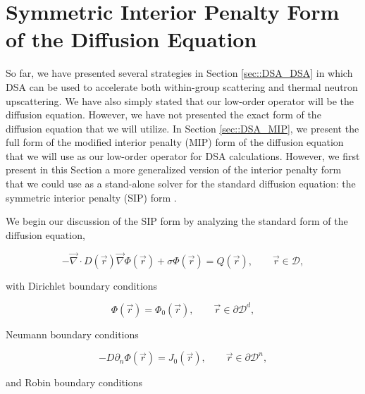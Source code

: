 \section{Symmetric Interior Penalty Form of the Diffusion Equation}
\label{sec::DSA_SIP}

So far, we have presented several strategies in Section \ref{sec::DSA_DSA} in which DSA can be used to accelerate both within-group scattering and thermal neutron upscattering. We have also simply stated that our low-order operator will be the diffusion equation. However, we have not presented the exact form of the diffusion equation that we will utilize. In Section \ref{sec::DSA_MIP}, we present the full form of the modified interior penalty (MIP) form of the diffusion equation that we will use as our low-order operator for DSA calculations. However, we first present in this Section a more generalized version of the interior penalty form that we could use as a stand-alone solver for the standard diffusion equation: the symmetric interior penalty (SIP) form \cite{arnold2002unified,ragusa2015discontinuous,ref::SIP_3D}.

We begin our discussion of the SIP form by analyzing the standard form of the diffusion equation,

\begin{equation}
\label{eq::DSA_standard_diff_eq}
- \vec{\nabla}  \cdot D (\vec{r})  \vec{\nabla} \Phi (\vec{r}) + \sigma \Phi (\vec{r}) = Q (\vec{r}) , \qquad \vec{r} \in \mathcal{D} ,
\end{equation}

\noindent with Dirichlet boundary conditions

\begin{equation}
\label{eq::DSA_standard_diff_eq_dirichlet_bound}
\Phi (\vec{r}) = \Phi_0 (\vec{r}), \qquad \vec{r} \in \partial \mathcal{D}^d ,
\end{equation}

\noindent Neumann boundary conditions

\begin{equation}
\label{eq::DSA_standard_diff_eq_neumann_bound}
- D \partial_n \Phi (\vec{r}) = J_0 (\vec{r}), \qquad \vec{r} \in \partial \mathcal{D}^n ,
\end{equation}

\noindent and Robin boundary conditions


